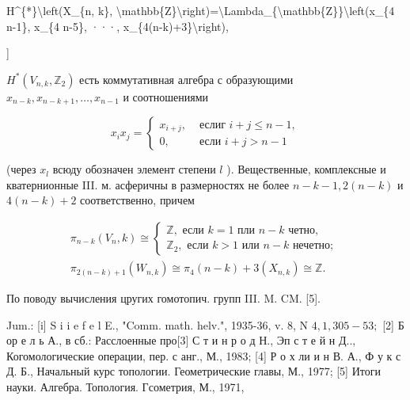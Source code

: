 \documentclass[10pt]{article}
\begin{document}
H\^{}\{*\}\textbackslash left(X\_\{n, k\}, \textbackslash mathbb\{Z\}\textbackslash right)=\textbackslash Lambda\_\{\textbackslash mathbb\{Z\}\}\textbackslash left(x\_\{4 n-1\}, x\_\{4 n-5\}, ···, x\_\{4(n-k)+3\}\textbackslash right),

]



$H^{*}\left(V_{n, k}, \mathbb{Z}_{2}\right)$ есть коммутативная алгебра с образующими $x_{n-k}, x_{n-k+1}, \ldots, x_{n-1}$ и соотношениями



\[

x_{i} x_{j}= \begin{cases}x_{i+j}, & \text { еслиг } i+j \leqslant n-1, \\ 0, & \text { если } i+j>n-1\end{cases}

\]



(через $x_{l}$ всюду обозначен элемент степени $l$ ). Вещественные, комплексные и кватернионные III. м. асферичны в размерностях не более $n-k-1,2(n-k)$ и $4(n-k)+2$ соответственно, причем



\[

\begin{gathered}

\pi_{n-k}\left(V_{n}, k\right) \cong\left\{\begin{array}{l}

\mathbb{Z}, \text { если } k=1 \text { пли } n-k \text { четно, } \\

\mathbb{Z}_{2}, \text { если } k>1 \text { или } n-k \text { нечетно; }

\end{array}\right. \\

\pi_{2(n-k)+1}\left(W_{n, k}\right) \cong \pi_{4}(n-k)+3\left(X_{n, k}\right) \cong \mathbb{Z} .

\end{gathered}

\]



По поводу вычисления цругих гомотопич. групп III. M. CM. [5].



Jum.: [i] S i i e f e l E., "Comm. math. helv.", 1935-36, v. 8, N $4,1,305-53 ;$ [2] Б ор е л ь А., в сб.: Расслоенные про[3] С т и н р о д Н., Эп с т е й н Д.., Когомологические операции, пер. с анг., М., 1983; [4] Р о х ли и н В. А., Ф у к с Д. Б., Начальный курс топологии. Геометрические главы, М., 1977; [5] Итоги науки. Алгебра. Топология. Гсометрия, М., 1971,
\end{document}
